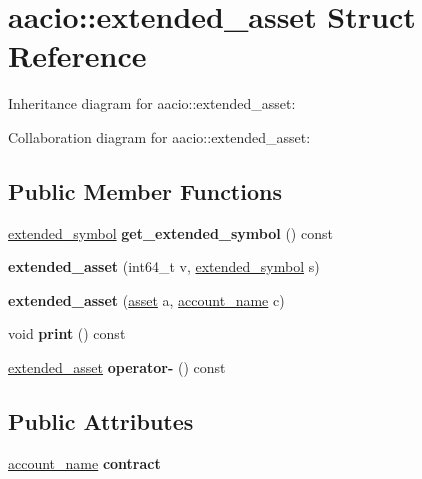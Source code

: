 \hypertarget{structaacio_1_1extended__asset}{}\section{aacio\+:\+:extended\+\_\+asset Struct Reference}
\label{structaacio_1_1extended__asset}


Inheritance diagram for aacio\+:\+:extended\+\_\+asset\+:


Collaboration diagram for aacio\+:\+:extended\+\_\+asset\+:
\subsection*{Public Member Functions}
\begin{DoxyCompactItemize}
\item 
\mbox{\label{structaacio_1_1extended__asset_a9bace938179994e518e94717e143ac4d}} 
\mbox{\hyperlink{structaacio_1_1extended__symbol}{extended\+\_\+symbol}} {\bfseries get\+\_\+extended\+\_\+symbol} () const
\item 
\mbox{\label{structaacio_1_1extended__asset_ab00c24d4f5d64fb8e736c1bc8ef3d861}} 
{\bfseries extended\+\_\+asset} (int64\+\_\+t v, \mbox{\hyperlink{structaacio_1_1extended__symbol}{extended\+\_\+symbol}} s)
\item 
\mbox{\label{structaacio_1_1extended__asset_a40787163fd781d66ade39aab2b59b74d}} 
{\bfseries extended\+\_\+asset} (\mbox{\hyperlink{structaacio_1_1asset}{asset}} a, \mbox{\hyperlink{structaacio_1_1chain_1_1name}{account\+\_\+name}} c)
\item 
\mbox{\label{structaacio_1_1extended__asset_af95d4967b471e26d3cef9d610599652e}} 
void {\bfseries print} () const
\item 
\mbox{\label{structaacio_1_1extended__asset_a4a4d841f2bb21bf8b19bb5500587a2ca}} 
\mbox{\hyperlink{structaacio_1_1extended__asset}{extended\+\_\+asset}} {\bfseries operator-\/} () const
\end{DoxyCompactItemize}
\subsection*{Public Attributes}
\begin{DoxyCompactItemize}
\item 
\mbox{\label{structaacio_1_1extended__asset_a1d178fc39aea4052fd2ee64066da3be4}} 
\mbox{\hyperlink{structaacio_1_1chain_1_1name}{account\+\_\+name}} {\bfseries contract}
\end{DoxyCompactItemize}
